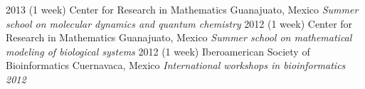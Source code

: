 \documentclass[]{friggeri-cv} %
\begin{document}
\begin{entrylist}
\entry
{2013}
{(1 week)}
{Center for Research in Mathematics}
{Guanajuato, Mexico}
{{\normalsize\emph{Summer school on molecular dynamics and quantum chemistry}}}
{\vspace{-3mm}}
\entry
{2012}
{(1 week)}
{Center for Research in Mathematics}
{Guanajuato, Mexico}
{{\normalsize\emph{Summer school on mathematical modeling of biological systems}}}
{\vspace{-3mm}}
\entry
{2012}
{(1 week)}
{Iberoamerican Society of Bioinformatics}
{Cuernavaca, Mexico}
{{\normalsize\emph{International workshops in bioinformatics 2012}}}
{\vspace{-3mm}}
\end{entrylist}

\end{document}
